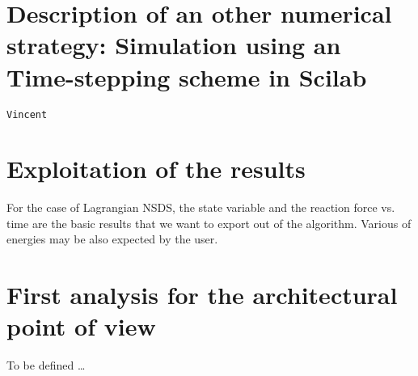 \documentclass[10pt]{article}
\begin{document}
\begin{algorithm}
\label{Algo:MTS}
\end{algorithm}


\section{Description of an other  numerical strategy: Simulation using an Time-stepping scheme in Scilab}
\label{Sec:Simulation}

\texttt{Vincent}

\section{Exploitation of the results}
\label{Sec:Results}

For the case of Lagrangian NSDS, the state variable and the reaction force vs. time are the basic results that we want to export out of the algorithm. Various of energies may be also expected by the user. 


\section{First analysis for the architectural point of view}
\label{Sec:Analysis}

To be defined \ldots
\end{document}

